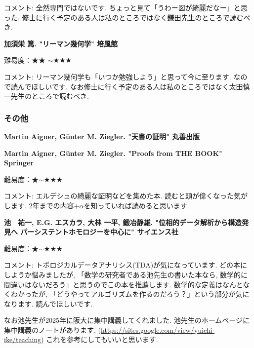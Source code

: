 コメント: 全然専門ではないです. ちょっと見て「うわー図が綺麗だなー」と思った. 修士に行く予定のある人は私のところではなく鎌田先生のところで読むべき. 
\vspace{8pt}

\textbf{加須栄 篤. "リーマン幾何学" 培風館}  　\vspace{-6pt} 

難易度：★★ $\sim$★★★\vspace{-6pt} 

コメント: リーマン幾何学も「いつか勉強しよう」と思って今に至ります. なので読んでほしいです. 
なお修士に行く予定のある人は私のところではなく太田慎一先生のところで読むべき.


\subsubsection{その他}

\textbf{Martin Aigner, G\"unter M. Ziegler. "天書の証明" 丸善出版}  　\vspace{-6pt} 

\textbf{Martin Aigner, G\"unter M. Ziegler. "Proofs from THE BOOK" Springer}  　\vspace{-6pt} 

難易度：★$\sim$★★★ 　\vspace{-6pt} 

コメント: エルデシュの綺麗な証明などを集めた本. 読むと頭が偉くなった気がします. 
2年までの内容$+\alpha$を知っていれば読めると思います.  
\vspace{8pt}

\textbf{池　祐一, E.G. エスカラ, 大林 一平, 鍛冶静雄. "位相的データ解析から構造発見へ パーシステントホモロジーを中心に" サイエンス社}  　\vspace{-6pt} 

難易度：★$\sim$★★★\vspace{-6pt} 

コメント: トポロジカルデータアナリシス(TDA)が気になっています. どの本にしようか悩みましたが, 「数学の研究者である池先生の書いた本なら, 数学的に間違いはないだろう」と思うのでこの本を推薦します. 数学的な定義はなんとなくわかったが, 「どうやってアルゴリズムを作るのだろう？」という部分が気になります. 読んでほしいです. 

なお池先生が2025年に阪大に集中講義してくれました. 池先生のホームページに集中講義のノートがあります. (\url{https://sites.google.com/view/yuichi-ike/teaching}) これを参考にしてもいいと思います. 
\vspace{8pt}

